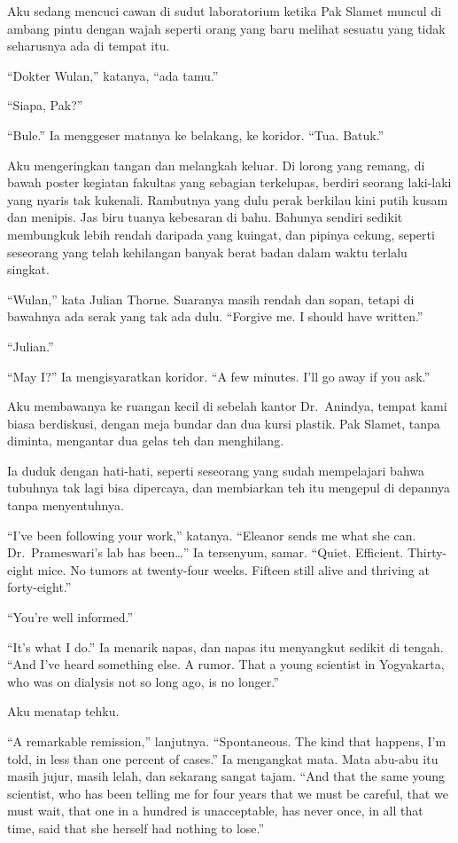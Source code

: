 \documentclass[11pt,twoside,openany]{book}
\begin{document}
Aku sedang mencuci cawan di sudut laboratorium ketika Pak Slamet muncul di ambang pintu dengan wajah seperti orang yang baru melihat sesuatu yang tidak seharusnya ada di tempat itu.

``Dokter Wulan,'' katanya, ``ada tamu.''

``Siapa, Pak?''

``Bule.'' Ia menggeser matanya ke belakang, ke koridor. ``Tua. Batuk.''

Aku mengeringkan tangan dan melangkah keluar. Di lorong yang remang, di bawah poster kegiatan fakultas yang sebagian terkelupas, berdiri seorang laki-laki yang nyaris tak kukenali. Rambutnya yang dulu perak berkilau kini putih kusam dan menipis. Jas biru tuanya kebesaran di bahu. Bahunya sendiri sedikit membungkuk lebih rendah daripada yang kuingat, dan pipinya cekung, seperti seseorang yang telah kehilangan banyak berat badan dalam waktu terlalu singkat.

``Wulan,'' kata Julian Thorne. Suaranya masih rendah dan sopan, tetapi di bawahnya ada serak yang tak ada dulu. ``Forgive me. I should have written.''

``Julian.''

``May I?'' Ia mengisyaratkan koridor. ``A few minutes. I'll go away if you ask.''

Aku membawanya ke ruangan kecil di sebelah kantor Dr.~Anindya, tempat kami biasa berdiskusi, dengan meja bundar dan dua kursi plastik. Pak Slamet, tanpa diminta, mengantar dua gelas teh dan menghilang.

Ia duduk dengan hati-hati, seperti seseorang yang sudah mempelajari bahwa tubuhnya tak lagi bisa dipercaya, dan membiarkan teh itu mengepul di depannya tanpa menyentuhnya.

``I've been following your work,'' katanya. ``Eleanor sends me what she can. Dr.~Prameswari's lab has been\ldots{}'' Ia tersenyum, samar. ``Quiet. Efficient. Thirty-eight mice. No tumors at twenty-four weeks. Fifteen still alive and thriving at forty-eight.''

``You're well informed.''

``It's what I do.'' Ia menarik napas, dan napas itu menyangkut sedikit di tengah. ``And I've heard something else. A rumor. That a young scientist in Yogyakarta, who was on dialysis not so long ago, is no longer.''

Aku menatap tehku.

``A remarkable remission,'' lanjutnya. ``Spontaneous. The kind that happens, I'm told, in less than one percent of cases.'' Ia mengangkat mata. Mata abu-abu itu masih jujur, masih lelah, dan sekarang sangat tajam. ``And that the same young scientist, who has been telling me for four years that we must be careful, that we must wait, that one in a hundred is unacceptable, has never once, in all that time, said that she herself had nothing to lose.''
\end{document}
